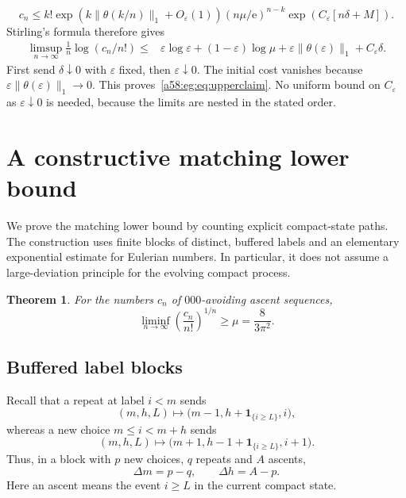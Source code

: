 \documentclass[11pt,letterpaper]{article}
\newtheorem{theorem}{Theorem}[section]
\theoremstyle{remark}
\newcommand{\ee}{\mathrm e}
\newcommand{\ind}[1]{\mathbf1_{\{#1\}}}
\newcommand{\muval}{\mu}
\begin{document}
\begin{equation}\label{a58:eg:eq:upperfinite}
 c_n\le k!\exp(k\|\theta(k/n)\|_1+O_\varepsilon(1))
    (n\muval/\ee)^{n-k}\exp(C_\varepsilon[n\delta+M]).
\end{equation}
Stirling's formula therefore gives
\begin{align*}
 \limsup_{n\to\infty}\frac1n\log(c_n/n!)
 \le{}&\varepsilon\log\varepsilon+(1-\varepsilon)\log\muval
       +\varepsilon\|\theta(\varepsilon)\|_1+C_\varepsilon\delta.
\end{align*}
First send $\delta\downarrow0$ with $\varepsilon$ fixed, then $\varepsilon\downarrow0$.
The initial cost vanishes because $\varepsilon\|\theta(\varepsilon)\|_1\to 0$.
This proves~\eqref{a58:eg:eq:upperclaim}. No uniform bound on $C_\varepsilon$ as $\varepsilon\downarrow0$ is needed, because the limits are nested in the stated order.

\section{A constructive matching lower bound}\label{a58:eg:sec:lower}

We prove the matching lower bound by counting explicit compact-state paths.
The construction uses finite blocks of distinct, buffered labels and an
elementary exponential estimate for Eulerian numbers. In particular, it does
not assume a large-deviation principle for the evolving compact process.

\begin{theorem}\label{a58:eg:low:theorem}
For the numbers \(c_n\) of \(000\)-avoiding ascent sequences,
\[
 \liminf_{n\to\infty}\left(\frac{c_n}{n!}\right)^{1/n}
 \ge \muval=\frac{8}{3\pi^2}.
\]
\end{theorem}

\subsection{Buffered label blocks}

Recall that a repeat at label \(i<m\) sends
\[
 (m,h,L)\longmapsto
 \bigl(m-1,h+\ind{i\ge L},i\bigr),
\]
whereas a new choice \(m\le i<m+h\) sends
\[
 (m,h,L)\longmapsto
 \bigl(m+1,h-1+\ind{i\ge L},i+1\bigr).
\]
Thus, in a block with \(p\) new choices, \(q\) repeats and \(A\) ascents,
\begin{equation}\label{a58:eg:low:drifts}
 \Delta m=p-q,\qquad \Delta h=A-p.
\end{equation}
Here an ascent means the event \(i\ge L\) in the current compact state.
\end{document}
